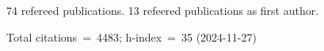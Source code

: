 74 refereed publications. 13 refeered publications as first author.

Total citations~=~4483; h-index~=~35 (2024-11-27)